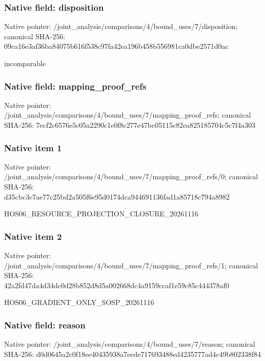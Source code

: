 \documentclass[10pt,a4paper]{article}
\begin{document}
\subsubsection{Native field: disposition}
Native pointer: /joint\_\allowbreak{}analysis/comparisons/4/bound\_\allowbreak{}uses/7/disposition; canonical SHA-256: 09ca16e3af36ba84075b616f538c97fa42ea196b458b556981ca0dbe2571d0ac

\begingroup\raggedright\sloppy incomparable\par\endgroup

\subsubsection{Native field: mapping\_\allowbreak{}proof\_\allowbreak{}refs}
Native pointer: /joint\_\allowbreak{}analysis/comparisons/4/bound\_\allowbreak{}uses/7/mapping\_\allowbreak{}proof\_\allowbreak{}refs; canonical SHA-256: 7ecf2c6576e5c05a2290c1e0f8c277e47bc05115c82ea825185704c5c7f4a303

\subsubsection{Native item 1}
Native pointer: /joint\_\allowbreak{}analysis/comparisons/4/bound\_\allowbreak{}uses/7/mapping\_\allowbreak{}proof\_\allowbreak{}refs/0; canonical SHA-256: d35cbc3c7ae77c25bd2a505f6e95d0174dca944691136fad1a85718c794a8982

\begingroup\raggedright\sloppy HOS06\_\allowbreak{}RESOURCE\_\allowbreak{}PROJECTION\_\allowbreak{}CLOSURE\_\allowbreak{}20261116\par\endgroup

\subsubsection{Native item 2}
Native pointer: /joint\_\allowbreak{}analysis/comparisons/4/bound\_\allowbreak{}uses/7/mapping\_\allowbreak{}proof\_\allowbreak{}refs/1; canonical SHA-256: 42a2fd47da4d34dc0d28b852d8d5a002668dc4a9159ccaf1e59c85c444378af0

\begingroup\raggedright\sloppy HOS06\_\allowbreak{}GRADIENT\_\allowbreak{}ONLY\_\allowbreak{}SOSP\_\allowbreak{}20261116\par\endgroup

\subsubsection{Native field: reason}
Native pointer: /joint\_\allowbreak{}analysis/comparisons/4/bound\_\allowbreak{}uses/7/reason; canonical SHA-256: d0d0645a2c0f18ee40435938a7eede717693488ed4235777ad4c49b802338f84
\end{document}
